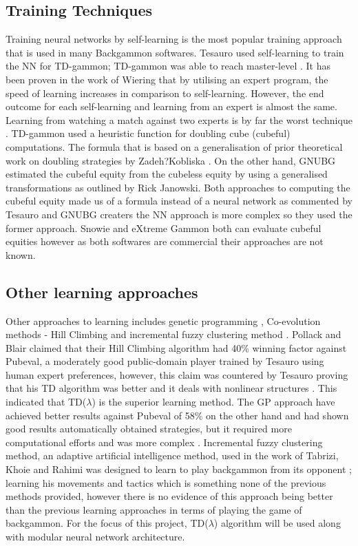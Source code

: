 \documentclass[12pt,a4paper]{article}
\begin{document}
\subsection{Training Techniques}
Training neural networks by self-learning is the most popular training approach that is used in many Backgammon softwares. Tesauro used self-learning to train the NN for TD-gammon; TD-gammon was able to reach master-level \cite{DBLP:conf/icml/Tesauro92}. It has been proven in the work of Wiering \cite{DBLP:journals/jilsa/Wiering10} that by utilising an expert program, the speed of learning increases in comparison to self-learning. However, the end outcome for each self-learning and learning from an expert is almost the same. Learning from watching a match against two experts is by far the worst technique \cite{DBLP:journals/jilsa/Wiering10}.
TD-gammon used a heuristic function for doubling cube (cubeful) computations. The formula that is based on a generalisation of prior theoretical work on doubling strategies by Zadeh?Kobliska \cite{DBLP:journals/ai/Tesauro02}. On the other hand, GNUBG estimated the cubeful equity from the cubeless equity by using a generalised transformations as outlined by Rick Janowski. Both approaches to computing the cubeful equity made us of a formula instead of a neural network as commented by Tesauro and GNUBG creaters the NN approach is more complex so they used the former approach. Snowie \cite{snowie} and eXtreme Gammon \cite{exg} both can evaluate cubeful equities however as both softwares are commercial their approaches are not known.

\subsection{Other learning approaches}
Other approaches to learning includes genetic programming \cite{DBLP:journals/gpem/AzariaS05}, Co-evolution methods - Hill Climbing \cite{DBLP:journals/ml/PollackB98} and incremental fuzzy clustering method \cite{DBLP:conf/nafips/TabriziKR15}. Pollack and Blair claimed that their Hill Climbing algorithm had 40\% winning factor against Pubeval, a moderately good public-domain player trained by Tesauro using human expert preferences, however, this claim was countered by Tesauro proving that his TD algorithm was better and it deals with nonlinear structures \cite{DBLP:journals/ml/Tesauro98}. This indicated that TD($\lambda$) is the superior learning method. The GP approach have achieved better results against Pubeval of 58\% on the other hand and had shown good results automatically obtained strategies, but it required more computational efforts and was more complex \cite{DBLP:journals/gpem/AzariaS05}. Incremental fuzzy clustering method, an adaptive artificial intelligence method, used in the work of Tabrizi, Khoie and Rahimi was designed to learn to play backgammon from its opponent \cite{DBLP:conf/nafips/TabriziKR15}; learning his movements and tactics which is something none of the previous methods provided, however there is no evidence of this approach being better than the previous learning approaches in terms of playing the game of backgammon. For the focus of this project, TD($\lambda$) algorithm will be used along with modular neural network architecture.
\end{document}
